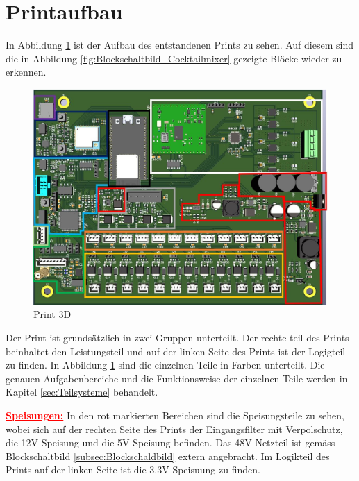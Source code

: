 \newpage
\section{Printaufbau}
\label{sec:Printaufbau}

In Abbildung \ref{fig:Print_3D} ist der Aufbau des entstandenen Prints zu sehen. Auf diesem sind die in Abbildung  \ref{fig:Blockschaltbild_Cocktailmixer} gezeigte Blöcke wieder zu erkennen. 

\begin{figure}[h!]
	\centering
	\includegraphics[width=\textwidth]{graphics/Printteile}
	\caption{Print 3D}
	\label{fig:Print_3D}
\end{figure} 

\newpage

Der Print ist grundsätzlich in zwei Gruppen unterteilt. Der rechte teil des Prints beinhaltet den Leistungsteil und auf der linken Seite des Prints ist der Logigteil zu finden. In Abbildung \ref{fig:Print_3D} sind die einzelnen Teile in Farben unterteilt. Die genauen Aufgabenbereiche und die Funktionsweise der einzelnen Teile werden in Kapitel \ref{sec:Teilsysteme} behandelt.\\


\textcolor{red}{\textbf{\underline{Speisungen:}}}
In den rot markierten Bereichen sind die Speisungsteile zu sehen, wobei sich auf der rechten Seite des Prints der Eingangsfilter mit Verpolschutz, die 12V-Speisung und die 5V-Speisung befinden. Das 48V-Netzteil ist gemäss Blockschaltbild \ref{subsec:Blockschaldbild} extern angebracht. Im Logikteil des Prints auf der linken Seite ist die 3.3V-Speisuung zu finden.

